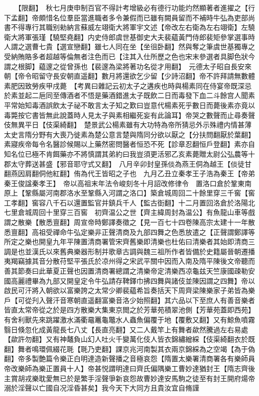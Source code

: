　　【限翻】　秋七月庚申制百官不得計考增級必有德行功能灼然顯著者進擢之【行下孟翻】帝頗惜名位羣臣當進職者多令兼假而已雖有闕員留而不補時牛弘為吏部尚書不得專行其職别勑納言蘇威左翊衛大將軍宇文述【帝改左右衛為左右翊衛】左驍衛大將軍張瑾【驍堅堯翻】内史侍郎虞世基御史大夫裴藴黃門侍郎裴矩參掌選事時人謂之選曹七貴【選宣戀翻】雖七人同在坐【坐徂卧翻】然與奪之筆虞世基獨專之受納賄賂多者超越等倫無者注色而已【注其入仕所歷之色也宋末參選者具脚色狀今謂之根脚】藴邃之從曾孫也【裴邃為梁將著功名從才用翻】　元德太子昭自長安來朝【帝令昭留守長安朝直遥翻】數月將還欲乞少留【少詩沼翻】帝不許拜請無數體素肥因致勞疾甲戌薨　【考異曰雜記云初太子之遘疾也時與楊素同在侍宴帝既深忌於素並起二巵同至傳酒者不悟是藥酒錯進太子既飲二日而毒發下血二斗餘宫人聞素平常始知毒酒誤飲太子祕不敢言太子知之歎曰豈意代楊素死乎數日而薨後素亦竟以毒斃按它書皆無此說蓋時人見太子與素相繼死妄有此論耳】帝哭之數聲而止尋奏聲伎無異平日【伎渠綺翻】　楚景武公楊素雖有大功特為帝所猜忌外示殊禮内情甚薄太史言隋分野有大喪乃徙素為楚公意言楚與隋同分欲以厭之【分扶問翻厭於葉翻】素寢疾帝每令名醫診候賜以上藥然密問醫者恒恐不死【診章忍翻恒戶登翻】素亦自知名位已極不肯餌藥亦不將慎謂其弟約曰我豈須更活邪乙亥素薨贈太尉公弘農等十郡太守葬送甚盛【邪音耶守式又翻】　八月辛卯封皇孫倓為燕王侗為越王【倓徒甘翻燕因肩翻侗他紅翻】侑為代王皆昭之子也　九月乙丑立秦孝王子浩為秦王【帝弟秦王俊諡秦孝王】　帝以高祖末年法令峻刻冬十月詔改修律令　置洛口倉於鞏東南原上【鞏縣屬河南郡洛水至鞏縣入河謂之洛口】築倉城周回二十餘里穿三千窖【窖工孝翻】窖容八千石以還置監官并鎮兵千人【監古衘翻】十二月置回洛倉於洛陽北七里倉城周回十里穿三百窖　初齊温公之世【齊主緯周封為温公】有魚龍山車等戲謂之散樂【散悉亶翻】周宣帝時鄭譯奏徵之【見一百七十四卷陳高宗太建十一年散悉亶翻】高祖受禪命牛弘定樂非正聲清商及九部四舞之色悉放遣之【正聲謂鄭譯等所定之樂也開皇九年平陳置清商署管宋齊舊樂即清樂也杜佑曰清樂者其始即清商三調是也並漢氏以來舊典樂器形制并歌章古調與魏三祖所作者皆備於史籍屬晉朝遷播夷羯竊據其音分散苻堅平張氏於凉州得之宋武平關中因而入南及隋平陳後文帝聽而善其節奏曰此華夏正聲也因置清商署總謂之清樂帝定清樂西凉龜兹天竺康國疎勒安國高麗禮畢為九部又開皇定令牛弘請存鞞鐸巾拂四舞與諸伎並陳因謂之四舞】帝以啟民可汗將入朝欲以富樂誇之太常少卿裴藴希旨奏括天下周齊梁陳樂家子弟皆為樂戶【可從刋入聲汗音寒朝直遥翻富樂音洛少始照翻】其六品以下至庶人有善音樂者皆直太常帝從之於是四方散樂大集東京閲之於芳華苑積翠池側【芳華苑蓋即西苑】有舍利獸先來跳躍激水滿衢黿鼉龜鼈水人蟲魚偏覆于地【覆敷又翻】又有鯨魚噴霧翳日倏忽化成黃龍長七八丈【長直亮翻】又二人戴竿上有舞者歘然騰過左右易處【歘許勿翻】又有神鼇負山幻人吐火千變萬化伎人皆衣錦繡繒綵【伎渠綺翻衣於既翻】舞者鳴環佩綴花毦【毦乃吏翻】課京兆河南製其衣兩京錦綵為之空竭【為于偽翻】帝多製艶篇令樂正白明達造新聲播之音極哀怨【隋置太樂署清商署各有樂師員帝改樂師為樂正置員十人】帝甚悦謂明達曰齊氏偏隅樂工曹妙達猶封王【隋志齊後主賞胡戎樂耽愛無已於是繁手淫聲爭新哀怨故曹妙達安馬駒之徒至有封王開府煬帝溺於淫聲以亡國自况淫昏甚矣】我今天下大同方且貴汝宜自脩謹

